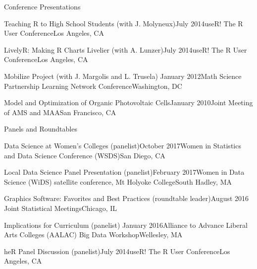 \documentclass{resume} %
\begin{document}
\begin{rSection}{Conference Presentations}
\begin{sSubsection}{Teaching R to High School Students}{ (with J. Molyneux)}{July 2014}{useR! The R User Conference}{Los Angeles, CA}
\end{sSubsection}

\begin{sSubsection}{LivelyR: Making R Charts Livelier}{ (with A. Lunzer)}{July 2014}{useR! The R User Conference}{Los Angeles, CA}
\end{sSubsection}

\begin{sSubsection}{Mobilize Project}{ (with J. Margolis and L. Trusela)} {January 2012}{Math Science Partnership Learning Network Conference}{Washington, DC}
\end{sSubsection}

\begin{sSubsection}{Model and Optimization of Organic Photovoltaic Cells}{}{January 2010}{Joint Meeting of AMS and MAA}{San Francisco, CA}
\end{sSubsection}
\end{rSection}

\begin{rSection}{Panels and Roundtables}



\begin{sSubsection}{Data Science at Women's Colleges}{ (panelist)}{October 2017}{Women in Statistics and Data Science Conference (WSDS)}{San Diego, CA}
\end{sSubsection}

\begin{sSubsection}{Local Data Science Panel Presentation}{ (panelist)}{February 2017}{Women in Data Science (WiDS) satellite conference, Mt Holyoke College}{South Hadley, MA}
\end{sSubsection}

\begin{sSubsection}{Graphics Software: Favorites and Best Practices}{ (roundtable leader)}{August 2016 }{Joint Statistical Meetings}{Chicago, IL}
\end{sSubsection}

\begin{sSubsection}{Implications for Curriculum}{ (panelist) }{January 2016}{Alliance to Advance Liberal Arts Colleges (AALAC) Big Data Workshop}{Wellesley, MA}
\end{sSubsection}

\begin{sSubsection}{heR Panel Discussion}{ (panelist)}{July 2014}{useR! The R User Conference}{Los Angeles, CA}
\end{sSubsection}


\end{rSection}
\end{document}
